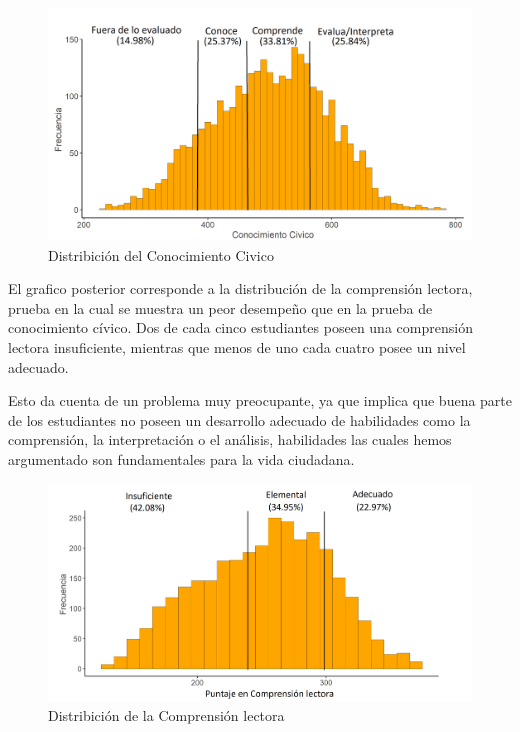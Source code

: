 \documentclass[12pt,twoside]{templates/facsothesis}
\begin{document}
\begin{figure}[!ht]

{\centering \includegraphics[width=1.1\linewidth,]{images/dist} 

}

\caption{Distribición del Conocimiento Civico}\label{fig:unnamed-chunk-7}
\end{figure}

\newpage

El grafico posterior corresponde a la distribución de la comprensión lectora, prueba en la cual se muestra un peor desempeño que en la prueba de conocimiento cívico. Dos de cada cinco estudiantes poseen una comprensión lectora insuficiente, mientras que menos de uno cada cuatro posee un nivel adecuado.

Esto da cuenta de un problema muy preocupante, ya que implica que buena parte de los estudiantes no poseen un desarrollo adecuado de habilidades como la comprensión, la interpretación o el análisis, habilidades las cuales hemos argumentado son fundamentales para la vida ciudadana.

\begin{figure}[!ht]

{\centering \includegraphics[width=1.1\linewidth,]{images/dist2} 

}

\caption{Distribición de la Comprensión lectora}\label{fig:unnamed-chunk-8}
\end{figure}
\end{document}
